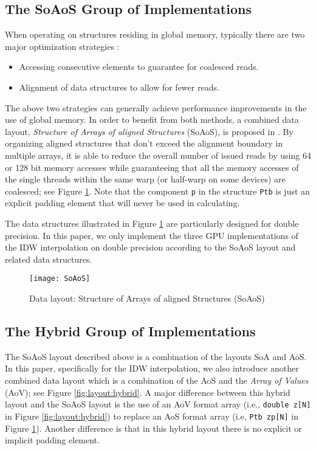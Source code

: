 \subsection{The SoAoS Group of Implementations}
\label{sec:implement:soaos}

When operating on structures residing in global memory, typically there are 
two major optimization strategies \cite{siegel2009}:

\begin{itemize}
\item Accessing consecutive elements to guarantee for coalesced reads.

\item Alignment of data structures to allow for fewer reads.
\end{itemize}


The above two strategies can generally achieve performance improvements in 
the use of global memory. In order to benefit from both methods, a combined 
data layout, \textit{Structure of Arrays of aligned Structures} (SoAoS), is proposed in \cite{siegel2009}. By organizing aligned 
structures that don't exceed the alignment boundary in multiple arrays, it 
is able to reduce the overall number of issued reads by using 64 or 128 bit 
memory accesses while guaranteeing that all the memory accesses of the 
single threads within the same warp (or half-warp on some devices) are 
coalesced; see Figure \ref{fig:layout:soaos}. Note that the component \texttt{p} in the structure \texttt{Ptb} is just 
an explicit padding element that will never be used in calculating. 

The data structures illustrated in Figure \ref{fig:layout:soaos} are particularly designed for 
double precision. In this paper, we only implement the three GPU 
implementations of the IDW interpolation on double precision according to 
the SoAoS layout and related data structures.

\begin{figure}[htb]
\centering
    \texttt{[image: SoAoS]}
    \caption{Data layout: Structure of Arrays of aligned Structures (SoAoS)}
    \label{fig:layout:soaos}       \end{figure}


\subsection{The Hybrid Group of Implementations}
\label{sec:implement:hybrid}

The SoAoS layout described above is a combination of the layouts SoA and 
AoS. In this paper, specifically for the IDW interpolation, we also 
introduce another combined data layout which is a combination of the AoS and the 
\textit{Array of Values }(AoV); see Figure \ref{fig:layout:hybrid}. A major difference between this hybrid layout and the 
SoAoS layout is the use of an AoV format array (i.e., \texttt{double z[N]} in Figure \ref{fig:layout:hybrid}) to replace an AoS format array
(i.e, \texttt{Ptb zp[N]} in Figure \ref{fig:layout:soaos}). Another difference is that in this hybrid layout there 
is no explicit or implicit padding element. 

